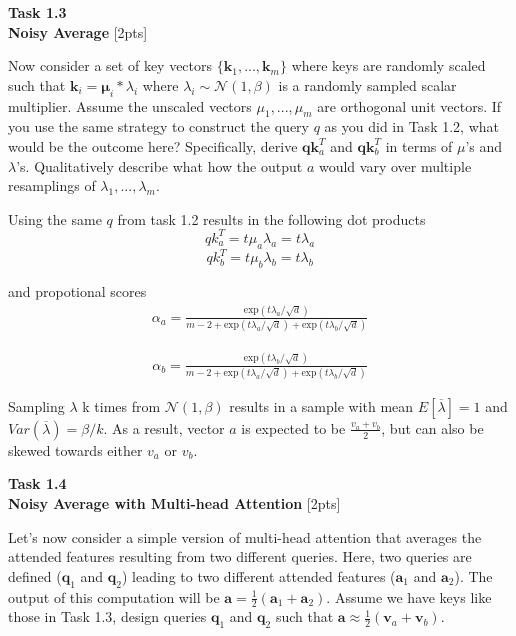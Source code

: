 \documentclass[12pt,article]{article}
\newenvironment{task}[2][Task]
    { \begin{mdframed}[backgroundcolor=gray!20] \textbf{#1 #2} \\}
    {  \end{mdframed}}
\begin{document}
\newpage
\begin{task}{1.3} 
\textbf{Noisy Average} [2pts]

Now consider a set of key vectors $\{\mathbf{k}_1, ... , \mathbf{k}_m\}$ where keys are randomly scaled such that $\mathbf{k}_i = \mathbf{\mu}_i*\lambda_i$ where $\lambda_i \sim \mathcal{N}(1, \beta)$ is a randomly sampled scalar multiplier. Assume the unscaled vectors $\mu_1, ..., \mu_m$ are orthogonal unit vectors. If you use the same strategy to construct the query $q$ as you did in Task 1.2, what would be the outcome here? Specifically, derive $\mathbf{q}\mathbf{k}_a^T$ and $\mathbf{q}\mathbf{k}_b^T$ in terms of $\mu$'s and $\lambda$'s. Qualitatively describe what how the output $a$ would vary over multiple resamplings of $\lambda_1, ..., \lambda_m$.
\end{task}
Using the same $q$ from task 1.2 results in the following dot products
$$qk_a^T = t \mu_a \lambda_a = t \lambda_a$$
$$qk_b^T = t \mu_b \lambda_b = t \lambda_b$$

and propotional scores 
\begin{eqnarray}
\alpha_a = \frac{\mbox{exp}\left(t \lambda_a / \sqrt d\right)}{m - 2 + \mbox{exp}\left(t \lambda_a / \sqrt d\right) + \mbox{exp}\left(t \lambda_b / \sqrt d\right)}
\end{eqnarray}

\begin{eqnarray}
\alpha_b = \frac{\mbox{exp}\left(t \lambda_b / \sqrt d\right)}{m - 2 + \mbox{exp}\left(t \lambda_a / \sqrt d\right) + \mbox{exp}\left(t \lambda_b / \sqrt d\right)}
\end{eqnarray}

Sampling $\lambda$ k times from $\mathcal{N}(1,\beta)$ results in a sample with mean $E[\overline{\lambda}] = 1$ and $Var(\overline{\lambda}) = \beta/k$. As a result, vector $a$ is expected to be $\frac{v_a + v_b}{2}$, but can also be skewed towards either $v_a$ or $v_b$.
\begin{task}{1.4} 
\textbf{Noisy Average with Multi-head Attention} [2pts]

Let's now consider a simple version of multi-head attention that averages the attended features resulting from two different queries. Here, two queries are defined ($\mathbf{q}_1$ and $\mathbf{q}_2$) leading to two different attended features ($\mathbf{a}_1$ and $\mathbf{a}_2$). The output of this computation will be $\mathbf{a} = \frac{1}{2}(\mathbf{a}_1 + \mathbf{a}_2)$. Assume we have keys like those in Task 1.3, design queries $\mathbf{q}_1$ and $\mathbf{q}_2$ such that $\mathbf{a} \approx \frac{1}{2}(\mathbf{v}_a + \mathbf{v}_b)$.
\end{task}
\end{document}
